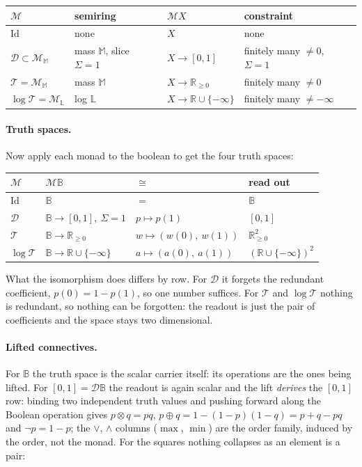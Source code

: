 \documentclass[anon]{../../journal-templates/NeSy26/nesy2026} %
\begin{document}
\begin{center}\small
\begin{tabular}{@{}llll@{}}
\toprule
$\mathcal M$ & semiring & $\mathcal M X$ & constraint \\
\midrule
$\mathrm{Id}$ & none & $X$ & none \\[2pt]
$\mathcal D \subset \mathcal M_{\mathbb M}$ & mass $\mathbb M$, slice $\Sigma{=}1$ & $X \to [0,1]$ & finitely many ${\ne} 0$, $\Sigma = 1$ \\[2pt]
$\mathcal T = \mathcal M_{\mathbb M}$ & mass $\mathbb M$ & $X \to \mathbb R_{\ge 0}$ & finitely many ${\ne} 0$ \\[2pt]
$\log\mathcal T = \mathcal M_{\mathbb L}$ & log $\mathbb L$ & $X \to \mathbb R \cup \{-\infty\}$ & finitely many ${\ne} {-\infty}$ \\
\bottomrule
\end{tabular}
\end{center}

\paragraph{Truth spaces.} Now apply each monad to the boolean to get the four truth spaces:

\begin{center}\small
\begin{tabular}{@{}llll@{}}
$\mathcal M$ & $\mathcal M\mathbb B$ & $\cong$ & read out \\
\midrule
$\mathrm{Id}$ & $\mathbb B$ & $=$ & $\mathbb B$ \\[2pt]
$\mathcal D$ & $\mathbb B \to [0,1],\ \Sigma {=} 1$ & $p \mapsto p(1)$ & $[0,1]$ \\[2pt]
$\mathcal T$ & $\mathbb B \to \mathbb R_{\ge 0}$ & $w \mapsto (w(0),\ w(1))$ & $\mathbb R_{\ge 0}^{2}$ \\[2pt]
$\log\mathcal T$ & $\mathbb B \to \mathbb R \cup \{-\infty\}$ & $a \mapsto (a(0),\ a(1))$ & $(\mathbb R {\cup} \{-\infty\})^{2}$ \\
\end{tabular}
\end{center}

\noindent
What the
isomorphism does differs by row. For
$\mathcal D$ it forgets the redundant coefficient,
$p(0) = 1 - p(1)$, so one number suffices.
For $\mathcal T$ and $\log\mathcal T$ nothing is redundant, so
nothing can be forgotten: the readout is just the pair of coefficients and the space stays two dimensional.

\paragraph{Lifted connectives.} For $\mathbb B$ the truth space is the
scalar carrier itself: its operations are the ones being lifted. For
$[0,1] = \mathcal D\mathbb B$ the readout is again scalar and the lift
\emph{derives} the $[0,1]$ row: binding two independent truth values and
pushing forward along the Boolean operation gives
$p \otimes q = pq$, $p \oplus q = 1-(1-p)(1-q) = p+q-pq$ and
$\neg p = 1-p$; the $\vee$, $\wedge$ columns ($\max$, $\min$) are the
order family, induced by the order, not the monad. For the squares
nothing collapses as an element is a pair:
\end{document}
